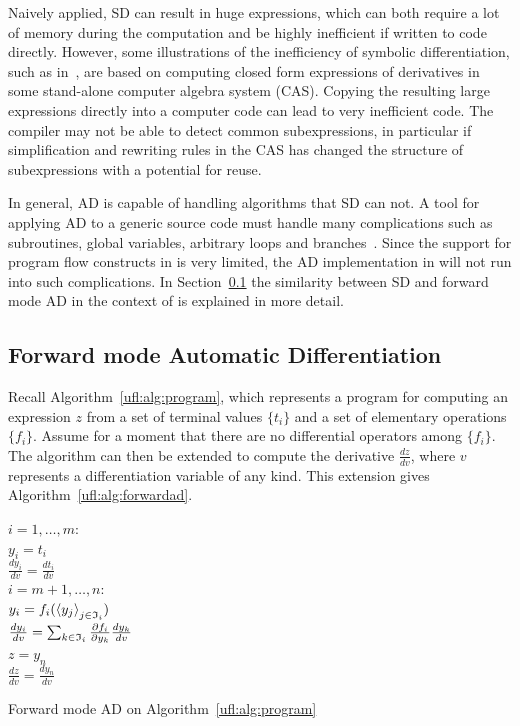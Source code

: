 Naively applied, SD can result in huge expressions, which can both
require a lot of memory during the computation and be highly
inefficient if written to code directly. However, some illustrations
of the inefficiency of symbolic differentiation, such as
in~\cite{Gri1989}, are based on computing closed form expressions of
derivatives in some stand-alone computer algebra system (CAS).
Copying the resulting large expressions directly into a computer code
can lead to very inefficient code. The compiler may not be able to
detect common subexpressions, in particular if simplification and
rewriting rules in the CAS has changed the structure of subexpressions
with a potential for reuse.

In general, AD is capable of handling algorithms that SD can not.  A
tool for applying AD to a generic source code must handle many
complications such as subroutines, global variables, arbitrary loops
and branches~\cite{BisCar1992,BisHov2002,GieKam1998}.  Since the
support for program flow constructs in \ufl{} is very limited, the AD
implementation in \ufl{} will not run into such complications.  In
Section~\ref{ufl:sec:forwardad} the similarity between SD and forward
mode AD in the context of \ufl{} is explained in more detail.

\subsection{Forward mode Automatic Differentiation}
\label{ufl:sec:forwardad}

Recall Algorithm~\ref{ufl:alg:program}, which represents a program for
computing an expression $z$ from a set of terminal values $\{ t_i \}$
and a set of elementary operations $\{ f_i \}$. Assume for a moment
that there are no differential operators among $\{ f_i \}$.  The
algorithm can then be extended to compute the derivative $\frac{d z}{d
  v}$, where $v$ represents a differentiation variable of any kind.
This extension gives Algorithm~\ref{ufl:alg:forwardad}.

\begin{algorithm}
\afor $i = 1, \ldots, m$:\\
\tab $y_i = t_i$ \\
\tab $\frac{d y_i}{d v} = \frac{d t_i}{d v}$ \\
\afor $i = m+1, \ldots, n$:\\
\tab $y_i = f_i(\left\langle{y_j}\right\rangle_{j\in\mathfrak{I}_i})$ \\
\tab $\frac{d y_i}{d v} = \sum_{k\in\mathfrak{I}_i} \frac{\partial f_i}{\partial y_k} \frac{d y_k}{d v}$ \\
$z = y_n$ \\
$\frac{d z}{d v} = \frac{d y_n}{d v}$
\caption{Forward mode AD on Algorithm~\ref{ufl:alg:program}}
\label{ufl:alg:forwardad}
\end{algorithm}

